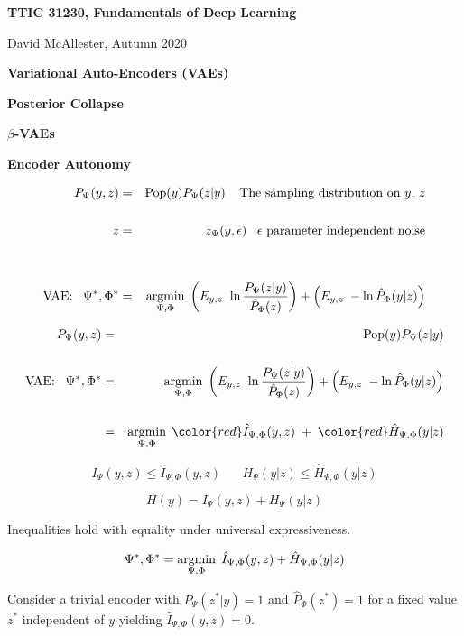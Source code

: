 





{\Huge

  \centerline{\bf TTIC 31230, Fundamentals of Deep Learning}
  \bigskip
  \centerline{David McAllester, Autumn 2020}
  \vfill
  \vfill
  \centerline{\bf Variational Auto-Encoders (VAEs)}
  \vfill
  \centerline{\bf Posterior Collapse}
  \vfill
  \centerline{\bf $\beta$-VAEs}
  \vfill
  \centerline{\bf Encoder Autonomy}
  \vfill

  \vfill
  \vfill

{\huge
\begin{eqnarray*}
P_\Psi(y,z) & = & \mathrm{Pop}(y)P_\Psi(z|y)\;\;\;\;\mbox{The sampling distribution on $y$, $z$} \\
\\
z & = & z_\Psi(y,\epsilon) \;\;\;\mbox{$\epsilon$ parameter independent noise} \\
\\
\\
\mbox{VAE:}\;\;\;\Psi^*,\Phi^*  & = & \operatorname*{argmin}_{\Psi,\Phi}\; \left(E_{y,z} \;\;{\ln \frac{P_\Psi(z|y)}{\hat{P}_\Phi(z)}}\right)  + \left(E_{y,z}\;-\ln {\hat{P}_\Phi(y|z)}\right)
\end{eqnarray*}}

{\huge
\begin{eqnarray*}
P_\Psi(y,z) & = & \pop(y)P_\Psi(z|y) \\
\\
\mbox{VAE:}\;\;\;\Psi^*,\Phi^*  & = & \argmin_{\Psi,\Phi}\; \parens{E_{y,z} \;\;{\ln \frac{P_\Psi(z|y)}{\hat{P}_\Phi(z)}}}  + \parens{E_{y,z}\;-\ln {\hat{P}_\Phi(y|z)}} \\
\\
& = & \argmin_{\Psi,\Phi}\; {\color{red} \hat{I}_{\Psi,\Phi}(y,z)} \;+\; {\color{red} \hat{H}_{\Psi,\Phi}(y|z)}
\end{eqnarray*}

{\color{red}
$$I_\Psi(y,z) \leq \hat{I}_{\Psi,\Phi}(y,z) \;\;\;\;\;\; H_\Psi(y|z) \leq \hat{H}_{\Psi,\Phi}(y|z)$$

$$H(y) = I_\Psi(y,z) + H_\Psi(y|z)$$}
}

Inequalities hold with equality under universal expressiveness.


$$\Psi^*,\Phi^* = \operatorname*{argmin}_{\Psi,\Phi}\;\hat{I}_{\Psi,\Phi}(y,z) + \hat{H}_{\Psi,\Phi}(y|z)$$

\vfill
Consider a trivial encoder with $P_\Psi(z^*|y) =1$ and $\hat{P}_\Phi(z^*) = 1$ for a fixed value $z^*$ independent of $y$ yielding
{\color{red} $\hat{I}_{\Psi,\Phi}(y,z) = 0$}.

}
